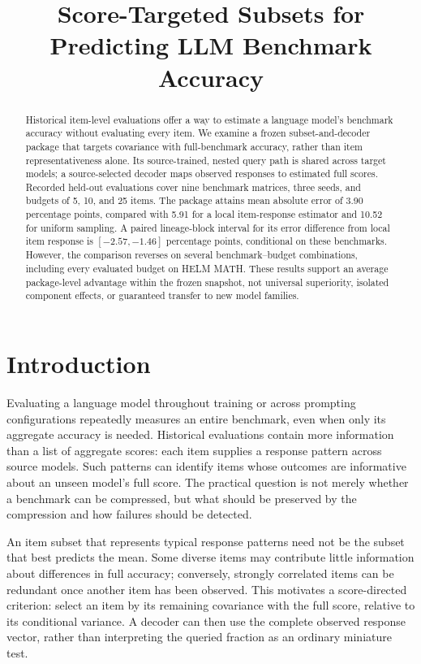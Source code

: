 \documentclass{article}
\title{Score-Targeted Subsets for Predicting LLM Benchmark Accuracy}
\author{}
\begin{document}
\maketitle

\begin{abstract}
Historical item-level evaluations offer a way to estimate a language model's benchmark accuracy without evaluating every item. We examine a frozen subset-and-decoder package that targets covariance with full-benchmark accuracy, rather than item representativeness alone. Its source-trained, nested query path is shared across target models; a source-selected decoder maps observed responses to estimated full scores. Recorded held-out evaluations cover nine benchmark matrices, three seeds, and budgets of 5, 10, and 25 items. The package attains mean absolute error of 3.90 percentage points, compared with 5.91 for a local item-response estimator and 10.52 for uniform sampling. A paired lineage-block interval for its error difference from local item response is $[-2.57,-1.46]$ percentage points, conditional on these benchmarks. However, the comparison reverses on several benchmark--budget combinations, including every evaluated budget on HELM MATH. These results support an average package-level advantage within the frozen snapshot, not universal superiority, isolated component effects, or guaranteed transfer to new model families.
\end{abstract}

\section{Introduction}
Evaluating a language model throughout training or across prompting configurations repeatedly measures an entire benchmark, even when only its aggregate accuracy is needed. Historical evaluations contain more information than a list of aggregate scores: each item supplies a response pattern across source models. Such patterns can identify items whose outcomes are informative about an unseen model's full score. The practical question is not merely whether a benchmark can be compressed, but what should be preserved by the compression and how failures should be detected.

An item subset that represents typical response patterns need not be the subset that best predicts the mean. Some diverse items may contribute little information about differences in full accuracy; conversely, strongly correlated items can be redundant once another item has been observed. This motivates a score-directed criterion: select an item by its remaining covariance with the full score, relative to its conditional variance. A decoder can then use the complete observed response vector, rather than interpreting the queried fraction as an ordinary miniature test.
\end{document}
